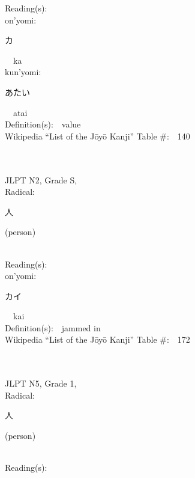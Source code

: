 \begin{multicols}{2}
Reading(s):\ \ \\
{\hspace*{1em}}on'yomi:\ \ \\
{\hspace*{2em}}{\begin{CJK}{UTF8}{min} カ \end{CJK}}\ \ ka\ \ \\
{\hspace*{1em}}kun'yomi:\ \ \\
{\hspace*{2em}}{\begin{CJK}{UTF8}{min} あたい \end{CJK}}\ \ atai\ \ \\
Definition(s):\ \ value \\
Wikipedia ``List of the J\=oy\=o Kanji'' Table \#:\ \ 140 \\
\ \ \\
{\fontsize{34pt}{40pt}  }\ \ \\  %
{JLPT N2, Grade S, \\Radical:\ \ {\begin{CJK}{UTF8}{min} 人 \end{CJK}} (person) } \\
Reading(s):\ \ \\
{\hspace*{1em}}on'yomi:\ \ \\
{\hspace*{2em}}{\begin{CJK}{UTF8}{min} カイ \end{CJK}}\ \ kai\ \ \\
Definition(s):\ \ jammed in \\
Wikipedia ``List of the J\=oy\=o Kanji'' Table \#:\ \ 172 \\
\ \ \\
{\fontsize{34pt}{40pt}  }\ \ \\  %
{JLPT N5, Grade 1, \\Radical:\ \ {\begin{CJK}{UTF8}{min} 人 \end{CJK}} (person) } \\
Reading(s):\ \ \\

\end{multicols}

